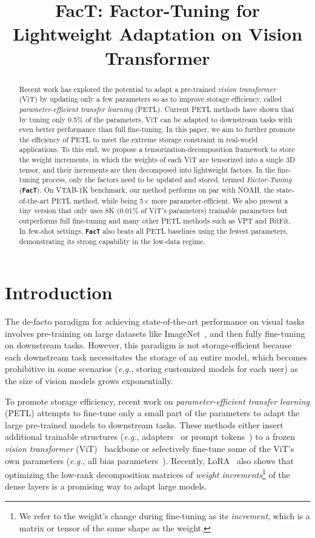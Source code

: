 \title{FacT: Factor-Tuning for Lightweight Adaptation on Vision Transformer}

\begin{abstract}
Recent work has explored the potential to adapt a pre-trained \emph{vision transformer} (ViT) by updating only a few parameters so as to improve storage efficiency, called \emph{parameter-efficient transfer learning} (PETL). Current PETL methods have shown that by tuning only 0.5\% of the parameters, ViT can be adapted to downstream tasks with even better performance than full fine-tuning. In this paper, we aim to further promote the efficiency of PETL to meet the extreme storage constraint in real-world applications. To this end, we propose a tensorization-decomposition framework to store the weight increments, in which the weights of each ViT are tensorized into a single 3D tensor, and their increments are then decomposed into lightweight factors. In the fine-tuning process, only the factors need to be updated and stored, termed \emph{Factor-Tuning} (\texttt{\textbf{FacT}}). On VTAB-1K benchmark, our method performs on par with NOAH, the state-of-the-art PETL method, while being 5$\times$ more parameter-efficient. We also present a tiny version that only uses 8K (0.01\% of ViT's parameters) trainable parameters but outperforms full fine-tuning and many other PETL methods such as VPT and BitFit. In few-shot settings, \texttt{\textbf{FacT}} also beats all PETL baselines using the fewest parameters, demonstrating its strong capability in the low-data regime.
\end{abstract}

\section{Introduction}

The de-facto paradigm for achieving state-of-the-art performance on visual tasks involves pre-training on large datasets like ImageNet~\cite{imagenet}, and then fully fine-tuning on downstream tasks. However, this paradigm is not storage-efficient because each downstream task necessitates the storage of an entire model, which becomes prohibitive in some scenarios (\emph{e.g.}, storing customized models for each user) as the size of vision models grows exponentially. 

To promote storage efficiency, recent work on \emph{parameter-efficient transfer learning} (PETL) attempts to fine-tune only a small part of the parameters to adapt the large pre-trained models to downstream tasks. These methods either insert additional trainable structures (\emph{e.g.}, adapters~\cite{adapter} or prompt tokens~\cite{vpt}) to a frozen \emph{vision transformer} (ViT)~\cite{vit} backbone or selectively fine-tune some of the ViT's own parameters (\emph{e.g.}, all bias parameters~\cite{bitfit}). Recently, LoRA~\cite{lora} also shows that optimizing the low-rank decomposition matrices of \emph{weight increments}\footnote{We refer to the weight's {change} during fine-tuning as its \emph{increment}, which is a matrix or tensor of the same shape as the weight.} of the dense layers is a promising way to adapt large models.

